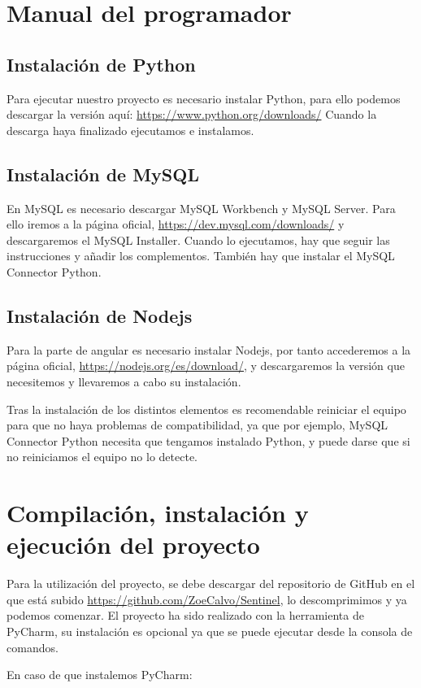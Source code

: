 \section{Manual del programador}

\subsection{Instalación de Python}
Para ejecutar nuestro proyecto es necesario instalar Python, para ello podemos descargar la versión aquí: \url{https://www.python.org/downloads/}
Cuando la descarga haya finalizado ejecutamos e instalamos.

\subsection{Instalación de MySQL}
En MySQL es necesario descargar MySQL Workbench y MySQL Server. Para ello iremos a la página oficial, \url{https://dev.mysql.com/downloads/} y descargaremos el MySQL Installer.
Cuando lo ejecutamos, hay que seguir las instrucciones y añadir los complementos. También hay que instalar el MySQL Connector Python.

\subsection{Instalación de Nodejs}
Para la parte de angular es necesario instalar Nodejs, por tanto accederemos a la página oficial, \url{https://nodejs.org/es/download/}, y descargaremos la versión que necesitemos y llevaremos a cabo su instalación.

Tras la instalación de los distintos elementos es recomendable reiniciar el equipo para que no haya problemas de compatibilidad, ya que por ejemplo, MySQL Connector Python necesita que tengamos instalado Python, y puede darse que si no reiniciamos el equipo no lo detecte.

\section{Compilación, instalación y ejecución del proyecto}
Para la utilización del proyecto, se debe descargar del repositorio de GitHub en el que está subido \url{https://github.com/ZoeCalvo/Sentinel}, lo descomprimimos y ya podemos comenzar.
El proyecto ha sido realizado con la herramienta de PyCharm, su instalación es opcional ya que se puede ejecutar desde la consola de comandos.

En caso de que instalemos PyCharm:

